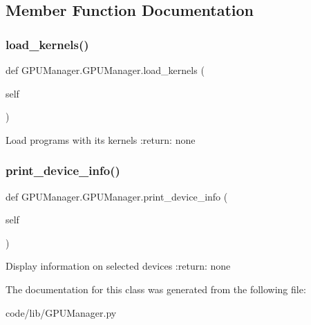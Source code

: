 \subsection{Member Function Documentation}
\mbox{\label{class_g_p_u_manager_1_1_g_p_u_manager_a95ccd16d4a81b00946d87f91bdca27e9}} 
\subsubsection{\texorpdfstring{load\+\_\+kernels()}{load\_kernels()}}
{\footnotesize\ttfamily def G\+P\+U\+Manager.\+G\+P\+U\+Manager.\+load\+\_\+kernels (\begin{DoxyParamCaption}\item[{}]{self }\end{DoxyParamCaption})}

\begin{DoxyVerb}Load programs with its kernels
:return: none
\end{DoxyVerb}
 \mbox{\label{class_g_p_u_manager_1_1_g_p_u_manager_a936c21f2d21ae94b581636e9255e71df}} 
\subsubsection{\texorpdfstring{print\+\_\+device\+\_\+info()}{print\_device\_info()}}
{\footnotesize\ttfamily def G\+P\+U\+Manager.\+G\+P\+U\+Manager.\+print\+\_\+device\+\_\+info (\begin{DoxyParamCaption}\item[{}]{self }\end{DoxyParamCaption})}

\begin{DoxyVerb}Display information on selected devices
:return:  none
\end{DoxyVerb}
 

The documentation for this class was generated from the following file\+:\begin{DoxyCompactItemize}
\item 
code/lib/G\+P\+U\+Manager.\+py\end{DoxyCompactItemize}
